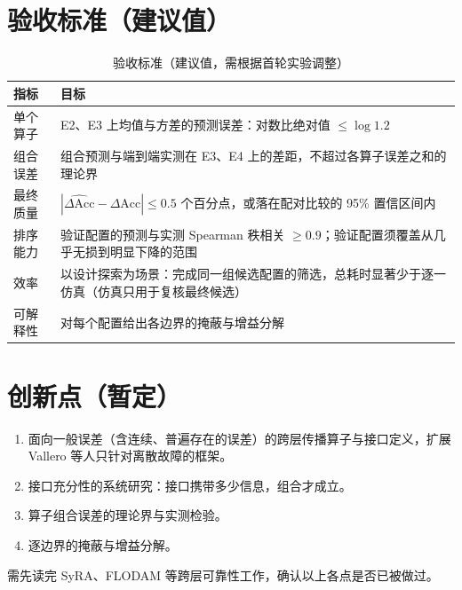 \documentclass[11pt,a4paper]{ctexart}
\begin{document}
\section{验收标准（建议值）}
\begin{table}[h]
\centering
\small
\begin{tabularx}{\textwidth}{@{}lX@{}}
\toprule
指标 & 目标 \\
\midrule
单个算子 & E2、E3 上均值与方差的预测误差：对数比绝对值 $\le \log 1.2$ \\
组合误差 & 组合预测与端到端实测在 E3、E4 上的差距，不超过各算子误差之和的理论界 \\
最终质量 & $|\widehat{\Delta\text{Acc}} - \Delta\text{Acc}| \le 0.5$ 个百分点，或落在配对比较的 95\% 置信区间内 \\
排序能力 & 验证配置的预测与实测 Spearman 秩相关 $\ge 0.9$；验证配置须覆盖从几乎无损到明显下降的范围 \\
效率 & 以设计探索为场景：完成同一组候选配置的筛选，总耗时显著少于逐一仿真（仿真只用于复核最终候选） \\
可解释性 & 对每个配置给出各边界的掩蔽与增益分解 \\
\bottomrule
\end{tabularx}
\caption{验收标准（建议值，需根据首轮实验调整）}
\end{table}

\section{创新点（暂定）}
\begin{enumerate}[leftmargin=*]
  \item 面向一般误差（含连续、普遍存在的误差）的跨层传播算子与接口定义，扩展 Vallero 等人只针对离散故障的框架。
  \item 接口充分性的系统研究：接口携带多少信息，组合才成立。
  \item 算子组合误差的理论界与实测检验。
  \item 逐边界的掩蔽与增益分解。
\end{enumerate}
需先读完 SyRA、FLODAM 等跨层可靠性工作，确认以上各点是否已被做过。
\end{document}
